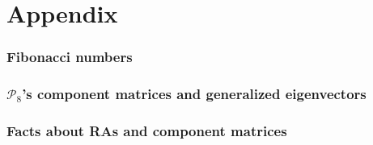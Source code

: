 

\section{Appendix}

\subsubsection{Fibonacci numbers}



\subsubsection{$\mathcal{P}_{8}$'s component matrices and generalized eigenvectors}



\subsubsection{Facts about RAs and component matrices}






